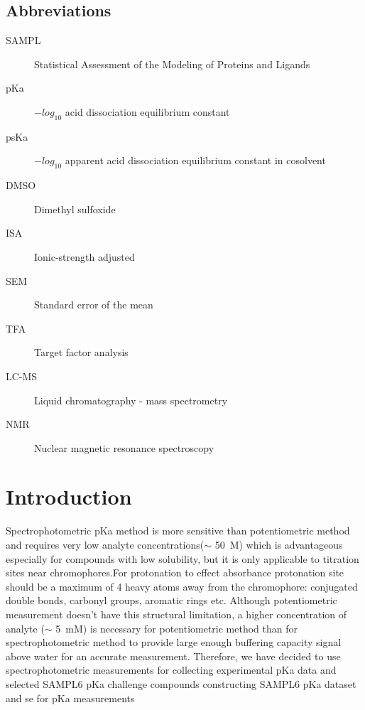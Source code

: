 \documentclass[9pt,lineno]{elife}
\begin{document}
\subsection{Abbreviations}
\begin{description}
\item[SAMPL] Statistical Assessment of the Modeling of Proteins and Ligands
\item[pKa] $-log_{10}$ acid dissociation equilibrium constant
\item[psKa] $-log_{10}$ apparent acid dissociation equilibrium constant in cosolvent
\item[DMSO] Dimethyl sulfoxide
\item[ISA] Ionic-strength adjusted
\item[SEM] Standard error of the mean
\item[TFA] Target factor analysis
\item[LC-MS] Liquid chromatography - mass spectrometry
\item[NMR] Nuclear magnetic resonance spectroscopy
\end{description}

\section{Introduction}





Spectrophotometric pKa method is more sensitive than potentiometric method and requires very low analyte concentrations($\sim$ 50~\micro M) which is advantageous especially for compounds with low solubility, but it is only applicable to titration sites near chromophores.For protonation to effect absorbance protonation site should be a maximum of 4 heavy atoms away from the chromophore: conjugated double bonds, carbonyl groups, aromatic rings etc.
Although potentiometric measurement doesn't have this structural limitation, a higher concentration of analyte ($\sim$ 5~mM) is necessary for potentiometric method than for spectrophotometric method to provide large enough buffering capacity signal above water for an accurate measurement. Therefore, we have decided to use spectrophotometric measurements for collecting experimental pKa data and selected SAMPL6 pKa challenge compounds constructing SAMPL6 pKa dataset and se for pKa measurements
\end{document}
